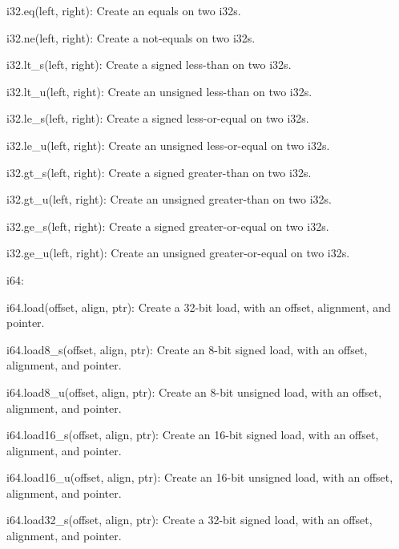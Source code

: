 \begin{DoxyItemize}
\begin{DoxyItemize}
\item {\ttfamily i32.\+eq(left, right)}\+: Create an equals on two {\ttfamily i32}s.
\item {\ttfamily i32.\+ne(left, right)}\+: Create a not-\/equals on two {\ttfamily i32}s.
\item {\ttfamily i32.\+lt\+\_\+s(left, right)}\+: Create a signed less-\/than on two {\ttfamily i32}s.
\item {\ttfamily i32.\+lt\+\_\+u(left, right)}\+: Create an unsigned less-\/than on two {\ttfamily i32}s.
\item {\ttfamily i32.\+le\+\_\+s(left, right)}\+: Create a signed less-\/or-\/equal on two {\ttfamily i32}s.
\item {\ttfamily i32.\+le\+\_\+u(left, right)}\+: Create an unsigned less-\/or-\/equal on two {\ttfamily i32}s.
\item {\ttfamily i32.\+gt\+\_\+s(left, right)}\+: Create a signed greater-\/than on two {\ttfamily i32}s.
\item {\ttfamily i32.\+gt\+\_\+u(left, right)}\+: Create an unsigned greater-\/than on two {\ttfamily i32}s.
\item {\ttfamily i32.\+ge\+\_\+s(left, right)}\+: Create a signed greater-\/or-\/equal on two {\ttfamily i32}s.
\item {\ttfamily i32.\+ge\+\_\+u(left, right)}\+: Create an unsigned greater-\/or-\/equal on two {\ttfamily i32}s.
\end{DoxyItemize}
\item {\ttfamily i64}\+:
\begin{DoxyItemize}
\item {\ttfamily i64.\+load(offset, align, ptr)}\+: Create a 32-\/bit load, with an offset, alignment, and pointer.
\item {\ttfamily i64.\+load8\+\_\+s(offset, align, ptr)}\+: Create an 8-\/bit signed load, with an offset, alignment, and pointer.
\item {\ttfamily i64.\+load8\+\_\+u(offset, align, ptr)}\+: Create an 8-\/bit unsigned load, with an offset, alignment, and pointer.
\item {\ttfamily i64.\+load16\+\_\+s(offset, align, ptr)}\+: Create an 16-\/bit signed load, with an offset, alignment, and pointer.
\item {\ttfamily i64.\+load16\+\_\+u(offset, align, ptr)}\+: Create an 16-\/bit unsigned load, with an offset, alignment, and pointer.
\item {\ttfamily i64.\+load32\+\_\+s(offset, align, ptr)}\+: Create a 32-\/bit signed load, with an offset, alignment, and pointer.

\end{DoxyItemize}
\end{DoxyItemize}
